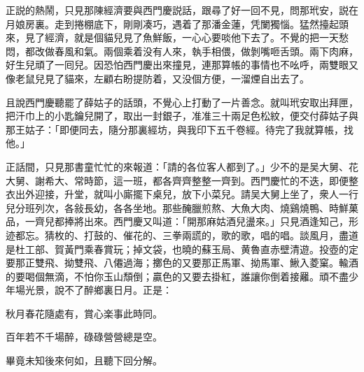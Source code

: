 正説的熱鬧，只見那陳經濟要與西門慶説話，跟尋了好一回不見，問那玳安，説在月娘房裏。走到捲棚底下，剛剛凑巧，遇着了那潘金蓮，凭闌獨惱。猛然擡起頭來，見了經濟，就是個貓兒見了魚鮮飯，一心心要啖他下去了。不覺的把一天愁悶，都改做春風和氣。兩個乘着没有人來，執手相偎，做剝嘴咂舌頭。兩下肉麻，好生兒頑了一囘兒。因恐怕西門慶出來撞見，連那算帳的事情也不吆呼，兩雙眼又像老鼠兒見了貓來，左顧右盼提防着，又没個方便，一溜煙自出去了。

且說西門慶聽罷了薛姑子的話頭，不覺心上打動了一片善念。就叫玳安取出拜匣，把汗巾上的小匙鑰兒開了，取出一封銀子，准准三十兩足色松紋，便交付薛姑子與那王姑子：「即便同去，隨分那裏經坊，與我印下五千卷經。待完了我就算帳，找他。」

正話間，只見那書童忙忙的來報道：「請的各位客人都到了。」少不的是吴大舅、花大舅、謝希大、常時節，這一班，都各齊齊整整一齊到。西門慶忙的不迭，即便整衣出外迎接，升堂，就叫小廝擺下桌兒，放下小菜兒。請吴大舅上坐了，衆人一行兒分班列次，各敍長幼，各各坐地。那些醃臘煎熬、大魚大肉、燒鷄燒鴨、時鮮菓品，一齊兒都捧將出來。西門慶又叫道：「開那麻姑酒兒盪來。」只見酒逢知己，形迹都忘。猜枚的、打鼓的、催花的、三拳兩謊的，歌的歌，唱的唱。談風月，盡道是杜工部、賀黃門乘春賞玩；掉文袋，也曉的蘇玉局、黄魯直赤壁清遊。投壺的定要那正雙飛、拗雙飛、八僊過海；擲色的又要那正馬軍、拗馬軍、鰍入菱窠。輸酒的要喝個無滴，不怕你玉山頹倒；贏色的又要去掛紅，誰讓你倒着接䍦。頑不盡少年場光景，說不了醉鄉裏日月。正是：

\begin{myquote}
秋月春花隨處有，賞心楽事此時同。

百年若不千場醉，碌碌營營總是空。
\end{myquote}

畢竟未知後來何如，且聽下回分解。


